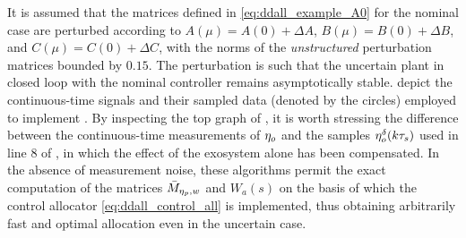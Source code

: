 \begin{example}
  It is assumed that the matrices defined in \eqref{eq:ddall_example_A0} for the nominal case are perturbed according to $A(\mu) = A(0) + \Delta A$, $B(\mu) = B(0) + \Delta B$, and $C(\mu) = C(0) + \Delta C$, with the norms of the \emph{unstructured} perturbation matrices bounded by $0.15$. The perturbation is such that the uncertain plant in closed loop with the nominal controller remains asymptotically stable.  depict the continuous-time signals and their sampled data (denoted by the circles) employed to implement . By inspecting the top graph of , it is worth stressing the difference between the continuous-time measurements of $\eta_o$ and the samples $\eta_o^\delta(k\tau_s)$ used in line 8 of , in which the effect of the exosystem alone has been compensated. In the absence of measurement noise, these algorithms permit the exact computation of the matrices $\bar{M}_{\eta_p,w}$ and	$W_a(s)$ on the basis of which the control allocator \eqref{eq:ddall_control_all} is implemented, thus obtaining arbitrarily fast and optimal allocation even in the uncertain case.


\end{example}
